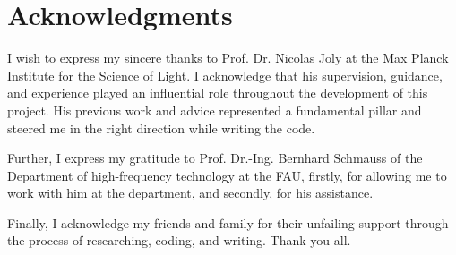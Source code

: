 \chapter*{Acknowledgments}
\thispagestyle{empty}

I wish to express my sincere thanks to Prof. Dr. Nicolas Joly
at the Max Planck Institute for the Science of Light. I acknowledge that his supervision, guidance, and experience played an influential role throughout the development of this project. His previous work and advice represented a fundamental pillar and steered me in the right direction while writing the code.

Further, I express my gratitude to Prof. Dr.-Ing. Bernhard Schmauss of the Department of high-frequency technology at the FAU, firstly, for allowing me to work with him at the department, and secondly, for his assistance.  

Finally,  I acknowledge my friends and family for their unfailing support through the process of researching, coding, and writing. Thank you all.
\clearpage